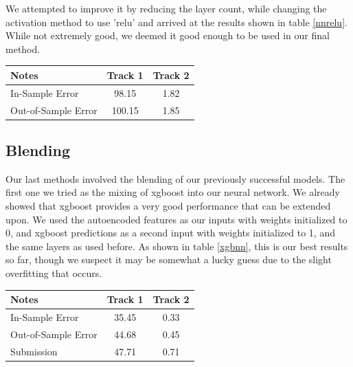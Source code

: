 \documentclass[a4paper, 12pt]{article}
\begin{document}
\begin{multicols}{2}
            We attempted to improve it by reducing the layer count, while changing the activation method to use 'relu' and arrived at the results shown in table \ref{nnrelu}. While not extremely good, we deemed it good enough to be used in our final method.

            \begin{center}
                \begin{tabular}{l|cc}
                    Notes & Track 1 & Track 2 \\
                    \hline
                    In-Sample Error & 98.15 & 1.82 \\
                    Out-of-Sample Error & 100.15 & 1.85 \\
                \end{tabular}
                \label{nnrelu}
            \end{center}

            \subsection{Blending}
                Our last methods involved the blending of our previously successful models. The first one we tried as the mixing of xgboost into our neural network. We already showed that xgboost provides a very good performance that can be extended upon. We used the autoencoded features as our inputs with weights initialized to 0, and xgboost predictions as a second input with weights initialized to 1, and the same layers as used before. As shown in table \ref{xgbnn}, this is our best results so far, though we suspect it may be somewhat a lucky guess due to the slight overfitting that occurs.

                \begin{center}
                    \begin{tabular}{l|cc}
                        Notes & Track 1 & Track 2 \\
                        \hline
                        In-Sample Error & 35.45 & 0.33 \\
                        Out-of-Sample Error & 44.68 & 0.45 \\
                        Submission & 47.71 & 0.71
                    \end{tabular}
                    \label{xgbnn}
                \end{center}


\end{multicols}
\end{document}
